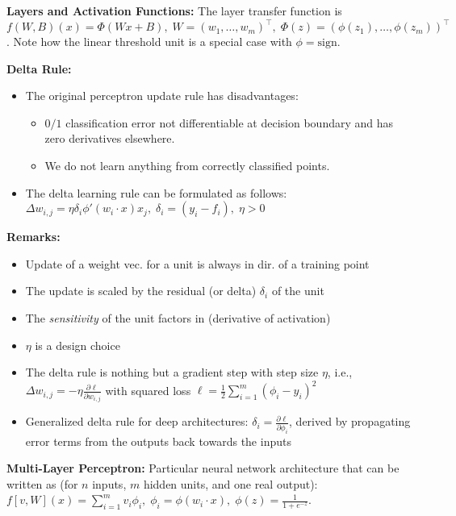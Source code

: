 \textbf{Layers and Activation Functions:} The layer transfer function is $f(W,B)(x) = \Phi(Wx +B), \; W= (w_1, \dots, w_m)^{\intercal}, \;\Phi(z)=(\phi(z_1), \dots, \phi(z_m))^{\intercal}$. Note how the linear threshold unit is a special case with $\phi = \text{sign}$. 


\textbf{Delta Rule:}
\begin{itemize}
    \item The original perceptron update rule has disadvantages:
    \begin{itemize}
        \item $0/1$ classification error not differentiable at decision boundary and has zero derivatives elsewhere.
        \item We do not learn anything from correctly classified points.
    \end{itemize}
    \item The delta learning rule can be formulated as follows:  \\$\Delta w_{i,j}=\eta\delta_i\phi'(w_i \cdot x)x_j, \; \delta_i=(y_i - f_i), \; \eta > 0$
\end{itemize}


\textbf{Remarks:} \begin{itemize}
    \item Update of a weight vec. for a unit is always in dir. of a training point
    \item The update is scaled by the residual (or delta) $\delta_i$ of the unit
    \item The \emph{sensitivity} of the unit factors in (derivative of activation)
    \item $\eta$ is a design choice
    \item The delta rule is nothing but a gradient step with step size $\eta$, i.e., $\Delta w_{i, j} = -\eta \frac{\partial \ell}{\partial w_{i,j}}$ with squared loss $\ell = \frac{1}{2} \sum_{i = 1}^{m} (\phi_i - y_i)^2$
    \item Generalized delta rule for deep architectures: $\delta_i = \frac{\partial \ell}{\partial \phi_i}$, derived by propagating error terms from the outputs back towards the inputs
\end{itemize}


\textbf{Multi-Layer Perceptron:} Particular neural network architecture that can be written as (for $n$ inputs, $m$ hidden units, and one real output): $f[v, W](x) = \sum_{i = 1}^m v_i\phi_i, \; \phi_i = \phi(w_i \cdot x), \; \phi(z) = \frac{1}{1 + e^{-z}}$. 

